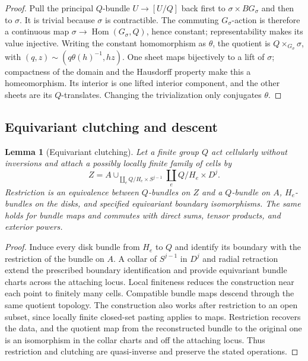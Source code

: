 \documentclass[11pt,a4paper,reqno]{amsart}
\numberwithin{equation}{section}
\newtheorem{lemma}[theorem]{Lemma}
\theoremstyle{remark}
\theoremstyle{plain}
\begin{document}
\begin{proof}
Pull the principal $Q$-bundle $U\to[U/Q]$ back first to
$\sigma\times BG_\sigma$ and then to $\sigma$. It is trivial because
$\sigma$ is contractible. The commuting $G_\sigma$-action is therefore a
continuous map $\sigma\to\operatorname{Hom}(G_\sigma,Q)$, hence constant;
representability makes its value injective. Writing the constant homomorphism as $\theta$, the quotient is
$Q\times_{G_\sigma}\sigma$, with
$(q,z)\sim(q\theta(h)^{-1},hz)$. One sheet maps bijectively to a lift of
$\sigma$; compactness of the domain and the Hausdorff property make this a
homeomorphism. Its interior is one lifted interior component, and the other
sheets are its $Q$-translates. Changing the trivialization only conjugates
$\theta$.
\end{proof}

\subsection{Equivariant clutching and descent}

\begin{lemma}[Equivariant clutching]\label{lem:clutching}
Let a finite group $Q$ act cellularly without inversions and attach a
possibly locally finite family of cells by
\[
 Z=A\cup_{\coprod_e Q/H_e\times S^{j-1}}
       \coprod_e Q/H_e\times D^j.
\]
Restriction is an equivalence between $Q$-bundles on $Z$ and a $Q$-bundle on
$A$, $H_e$-bundles on the disks, and specified equivariant boundary
isomorphisms. The same holds for bundle maps and commutes with direct sums,
tensor products, and exterior powers.
\end{lemma}

\begin{proof}
Induce every disk bundle from $H_e$ to $Q$ and identify its boundary with
the restriction of the bundle on $A$. A collar of $S^{j-1}$ in $D^j$ and
radial retraction extend the prescribed boundary identification and provide
equivariant bundle charts across the attaching locus. Local finiteness
reduces the construction near each point to finitely many cells. Compatible bundle maps descend through the same quotient topology. The
construction also works after restriction to an open subset, since locally
finite closed-set pasting applies to maps. Restriction recovers the data, and
the quotient map from the reconstructed bundle to the original one is an
isomorphism in the collar charts and off the attaching locus. Thus restriction and clutching are
quasi-inverse and preserve the stated operations.
\end{proof}
\end{document}
